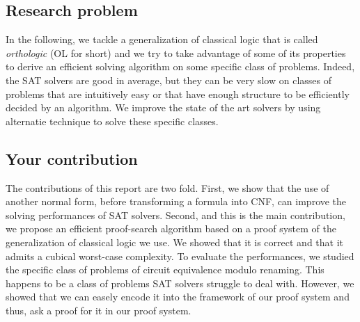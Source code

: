 \documentclass[a4paper, 11pt]{article}
\begin{document}
	\subsection*{Research problem}
	In the following, we tackle a generalization of classical logic that is called 
	\textit{orthologic} (OL for short) and we try to take advantage of
	some of its properties to derive an efficient solving algorithm on some specific class of 
	problems. Indeed, the SAT solvers are good in average, but they can be very slow on classes of
	problems that are intuitively easy or that have enough structure to be efficiently decided by an
	algorithm. We improve the state of the art solvers by using alternatie technique to solve these
	specific classes. 


	\subsection*{Your contribution}
	The contributions of this report are two fold. First, we show that the use of another normal
	form, before transforming a formula into CNF, can improve the solving performances of SAT 
	solvers.
	Second, and this is the main contribution, we propose an efficient proof-search algorithm based 
	on a proof system of the generalization of classical logic we use. We showed that it is correct 
	and that it admits a cubical worst-case complexity. To evaluate the performances, we studied the 
	specific class of problems of circuit
	equivalence modulo renaming. This happens to be a class of problems SAT solvers struggle to 
	deal with.
	However, we showed that we can easely encode it into the framework of our proof system and 
	thus, ask a proof for it in our proof system.
\end{document}
